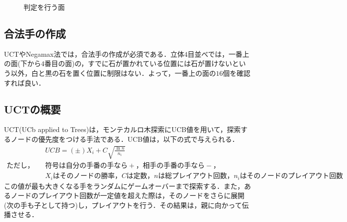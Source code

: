 \documentclass{jarticle}
\begin{document}
\begin{figure}[H]
\centering
	\caption{判定を行う面}
	\label{fig:planes}
\end{figure}



\subsection{合法手の作成}
UCTやNegamax法では，合法手の作成が必須である．立体$4$目並べでは，一番上の面(下から$4$番目の面)の，すでに石が置かれている位置には石が置けないという以外，白と黒の石を置く位置に制限はない．よって，一番上の面の$16$個を確認すれば良い．


\subsection{UCTの概要\cite{ref:book}}
UCT(UCb applied to Trees)は，モンテカルロ木探索にUCB値を用いて，探索するノードの優先度をつける手法である．UCB値は，以下の式で与えられる．
\begin{eqnarray}
\label{eq:ucb}
	&&UCB = (\pm) X_i + C \sqrt{\frac{\ln n}{n_i}} \\
	ただし，&&符号は自分の手番の手なら+，相手の手番の手なら-，\nonumber \\
	&&X_iはそのノードの勝率，Cは定数， nは総プレイアウト回数，n_iはそのノードのプレイアウト回数 \nonumber
\end{eqnarray}
この値が最も大きくなる手をランダムにゲームオーバーまで探索する．また，あるノードのプレイアウト回数が一定値を超えた際は，そのノードをさらに展開(次の手も子として持つ)し，プレイアウトを行う．その結果は，親に向かって伝播させる．
\end{document}
